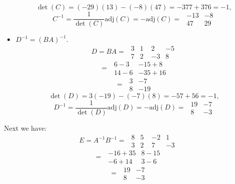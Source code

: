 \documentclass[12pt]{article}
\newcommand{\adj}{\textrm{adj}}
\begin{document}
\begin{itemize}
\[ \det(C) = (-29)(13) - (-8)(47) = - 377 + 376 = -1, \]
\[ C^{-1} = \frac{1}{\det(C)} \adj(C) = - \adj(C) = \hspace{4pt} \begin{array}{|cc|}-13&-8\\47&29\end{array}\]
\item $D^{-1}= (BA)^{-1}$.
\[ D = BA =  \hspace{4pt} \begin{array}{|cc|}3&1\\7&2\end{array} \hspace{4pt} \begin{array}{|cc|}2&-5\\-3&8\end{array}\]
\[ =  \hspace{4pt} \begin{array}{|cc|}6 - 3&- 15 + 8\\14 - 6&- 35 + 16\end{array}\]
\[ =  \hspace{4pt} \begin{array}{|cc|}3&-7\\8&-19\end{array}\]
\[ \det(D) = 3(-19) - (-7)(8) = - 57 + 56 = -1, \]
\[ D^{-1} = \frac{1}{\det(D)} \adj(D) = - \adj(D) = \hspace{4pt} \begin{array}{|cc|}19&-7\\8&-3\end{array}\]
\end{itemize}
Next we have:
\[ E = A^{-1}B^{-1} =  \hspace{4pt} \begin{array}{|cc|}8&5\\3&2\end{array} \hspace{4pt} \begin{array}{|cc|}-2&1\\7&-3\end{array}\]
\[ =  \hspace{4pt} \begin{array}{|cc|}-16 + 35&8- 15\\- 6 + 14&3 - 6\end{array}\]
\[ =  \hspace{4pt} \begin{array}{|cc|}19&-7\\8&-3\end{array}\]
\end{document}
